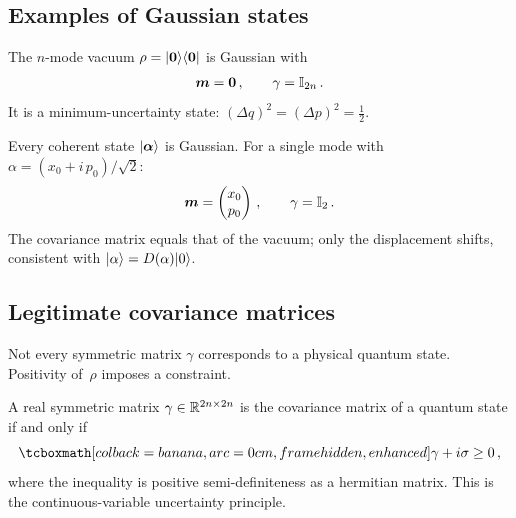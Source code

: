 \subsection{Examples of Gaussian states}\label{sec:gaussian-examples}

\begin{example}\label{ex:vacuum-gaussian}
  The $n$-mode vacuum $\rho = \lvert \boldsymbol{0} \rangle\langle \boldsymbol{0} \rvert$ is Gaussian
  with
  \begin{equation}\label{eq:vacuum-gaussian}
    \boldsymbol{m} = \boldsymbol{0}\,,\qquad \gamma = \mathbb{I}_{2n}\,.
  \end{equation}
  It is a minimum-uncertainty state:
  $(\Delta q)^2 = (\Delta p)^2 = \tfrac{1}{2}$.
\end{example}

\begin{example}\label{ex:coherent-gaussian}
  Every coherent state $\lvert \boldsymbol{\alpha} \rangle$ is Gaussian.  For a single
  mode with $\alpha = (x_0 + i\,p_0)/\sqrt{2}$:
  \begin{equation}\label{eq:coherent-gaussian}
    \boldsymbol{m} = \begin{pmatrix} x_0 \\ p_0 \end{pmatrix}\,,\qquad
    \gamma = \mathbb{I}_2\,.
  \end{equation}
  The covariance matrix equals that of the vacuum; only the
  displacement shifts, consistent with
  $\lvert \alpha \rangle = D(\alpha)\lvert 0 \rangle$.
\end{example}

\subsection{Legitimate covariance matrices}\label{sec:legit-cov}

Not every symmetric matrix $\gamma$ corresponds to a physical quantum
state.  Positivity of~$\rho$ imposes a constraint.

\begin{keyresult}
  A real symmetric matrix $\gamma \in \mathbb{R}^{2n \times 2n}$ is the
  covariance matrix of a quantum state if and only if
  \begin{equation}\label{eq:cov-condition}
    \eqbox{\gamma + i\sigma \geq 0}\,,
  \end{equation}
  where the inequality is positive semi-definiteness as a hermitian
  matrix.  This is the continuous-variable uncertainty principle.
\end{keyresult}

